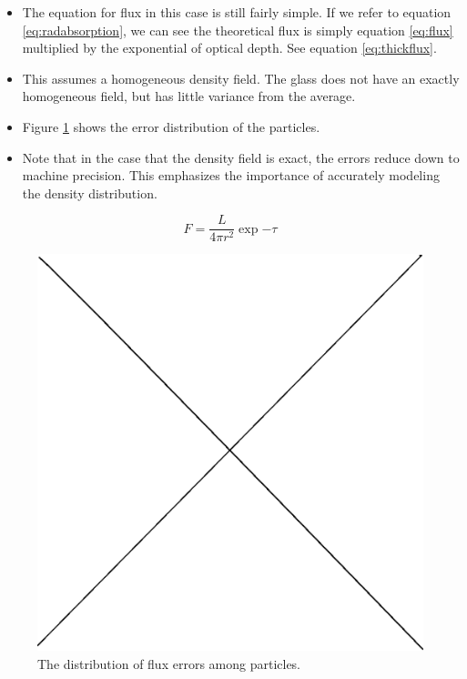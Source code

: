 \begin{itemize}
\item The equation for flux in this case is still fairly simple. If we refer to equation \ref{eq:radabsorption}, we can see the theoretical flux is simply equation \ref{eq:flux} multiplied by the exponential of optical depth. See equation \ref{eq:thickflux}.
\item This assumes a homogeneous density field. The glass does not have an exactly homogeneous field, but has little variance from the average.
\item Figure \ref{fig:thickglasserrors} shows the error distribution of the particles.
\item Note that in the case that the density field is exact, the errors reduce down to machine precision. This emphasizes the importance of accurately modeling the density distribution.
\end{itemize}

\begin{equation}
\label{eq:thickflux}
F = \frac{L}{4\pi r^2} \exp{-\tau}
\end{equation}

\begin{figure}
\includegraphics[width=\textwidth]{graphics/placeholder.eps}
\caption[Error distribution for a single source in a uniform field.]{The distribution of flux errors among particles.}
\label{fig:thickglasserrors}
\end{figure}

